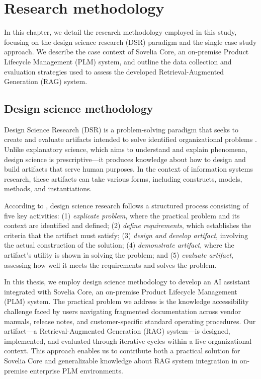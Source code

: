 \chapter{Research methodology}
\label{ch:research-methodology}

In this chapter, we detail the research methodology employed in this study, focusing on the design science research (DSR) paradigm and the single case study approach. We describe the case context of Sovelia Core, an on-premise Product Lifecycle Management (PLM) system, and outline the data collection and evaluation strategies used to assess the developed Retrieval-Augmented Generation (RAG) system.

\section{Design science methodology}
\label{sec:design-science-methodology}

Design Science Research (DSR) is a problem-solving paradigm that seeks to create and evaluate artifacts intended to solve identified organizational problems \parencite{johannesson_introduction_2021}. Unlike explanatory science, which aims to understand and explain phenomena, design science is prescriptive—it produces knowledge about how to design and build artifacts that serve human purposes. In the context of information systems research, these artifacts can take various forms, including constructs, models, methods, and instantiations.

According to \textcite{johannesson_introduction_2021}, design science research follows a structured process consisting of five key activities: (1) \emph{explicate problem}, where the practical problem and its context are identified and defined; (2) \emph{define requirements}, which establishes the criteria that the artifact must satisfy; (3) \emph{design and develop artifact}, involving the actual construction of the solution; (4) \emph{demonstrate artifact}, where the artifact's utility is shown in solving the problem; and (5) \emph{evaluate artifact}, assessing how well it meets the requirements and solves the problem.

In this thesis, we employ design science methodology to develop an AI assistant integrated with Sovelia Core, an on-premise Product Lifecycle Management (PLM) system. The practical problem we address is the knowledge accessibility challenge faced by users navigating fragmented documentation across vendor manuals, release notes, and customer-specific standard operating procedures. Our artifact—a Retrieval-Augmented Generation (RAG) system—is designed, implemented, and evaluated through iterative cycles within a live organizational context. This approach enables us to contribute both a practical solution for Sovelia Core and generalizable knowledge about RAG system integration in on-premise enterprise PLM environments.

